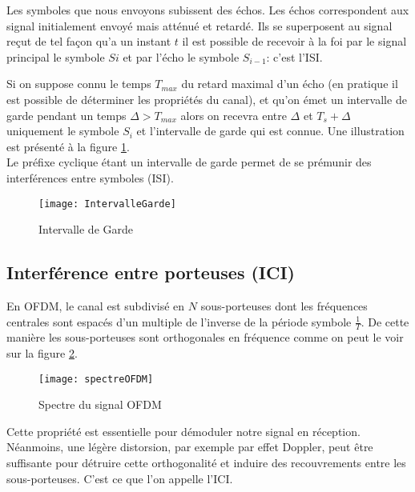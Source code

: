 Les symboles que nous envoyons subissent des échos. Les échos correspondent aux
signal initialement envoyé mais atténué et retardé. Ils se superposent au signal
reçut de tel façon qu'a un instant $t$ il est possible de recevoir à la foi par le
signal principal le symbole $Si$ et par l'écho le symbole $S_{i-1}$: c'est l'ISI.

Si on suppose connu le temps $T_{max}$ du retard maximal d'un écho (en pratique
il est possible de déterminer les propriétés du canal), et qu'on émet un
intervalle de garde pendant un temps $\Delta > T_{max}$ alors on recevra entre
$\Delta$ et $T_s+\Delta$ uniquement le symbole $S_i$ et l'intervalle de garde
qui est connue. Une illustration est présenté à la figure
\ref{fig:intervalleGarde}.
~\\

Le préfixe cyclique étant un intervalle de garde permet de se prémunir des
interférences entre symboles (ISI).



\begin{figure}[!h]
  \centering
  \texttt{[image: IntervalleGarde]}
  \caption{Intervalle de Garde}
  \label{fig:intervalleGarde}
\end{figure}

\subsection{Interférence entre porteuses (ICI)}
\label{sec:ICI}

En OFDM, le canal est subdivisé en $N$ sous-porteuses dont les fréquences centrales
sont espacés d'un multiple de l'inverse de la période symbole $\frac{1}{T}$. De
cette manière les sous-porteuses sont orthogonales en fréquence comme on peut le
voir sur la figure \ref{fig:spectre}.

\begin{figure}[!h]
  \centering
  \texttt{[image: spectreOFDM]}
  \caption{Spectre du signal OFDM \cite{annick}}
  \label{fig:spectre}
\end{figure}

Cette propriété est essentielle pour démoduler notre signal en réception.
Néanmoins, une légère distorsion, par exemple par effet Doppler, peut être
suffisante pour détruire cette orthogonalité et induire des recouvrements entre
les sous-porteuses. C'est ce que l'on appelle l'ICI.

